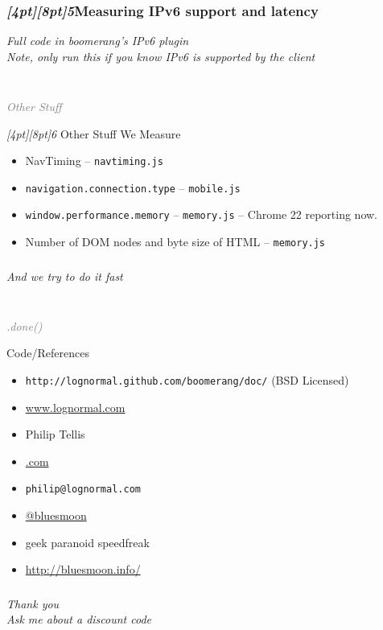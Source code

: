 \documentclass{beamer}
\newcommand{\sn}[1]{\textrm{\textit{\Huge{\raisebox{-3pt}[4pt][8pt]{\textcolor{f2elblue}{#1}}}}}\hspace{4pt}}
\newcommand{\innersplash}[1]{
  \begin{center}
    \large \textrm{\textit{ #1 } }
  \end{center}
}
\newcommand{\splashslide}[2][{}]{
  \begin{frame}
  \frametitle{#1}
  \innersplash{#2}
  \end{frame}
}
\newcommand{\leadinslide}[2]{
  \splashslide{
     {\fontsize{150}{20}\selectfont{\raisebox{0pt}[90pt][0pt]{\textcolor{light-gray}{#1}}}} \\ \huge \textcolor{gray}{#2}
  }
}
\begin{document}
\splashslide[\sn{5}Measuring IPv6 support and latency]{ Full code in boomerang's IPv6 plugin \\ \tiny Note, only run this if you know IPv6 is supported by the client}

\leadinslide{6}{Other Stuff}

\begin{frame}{\sn{6} Other Stuff We Measure}
\begin{itemize}
  \item NavTiming -- \texttt{navtiming.js}
  \item \texttt{navigation.connection.type} -- \texttt{mobile.js}
  \item \texttt{window.performance.memory}  -- \texttt{memory.js} -- Chrome 22 reporting now.
  \item Number of DOM nodes and byte size of HTML -- \texttt{memory.js}
\end{itemize}
\end{frame}

\splashslide{And we try to do it fast}

\leadinslide{--}{.done()}

\begin{frame}{Code/References}
  \begin{itemize}
    \item \texttt{http://lognormal.github.com/boomerang/doc/} (BSD Licensed)
    \item \href{http://www.lognormal.com}{www.lognormal.com}
  \end{itemize}
\end{frame}

\begin{frame}
  \begin{itemize}
  \item Philip Tellis
  \item \href{http://www.lognormal.com/}{\textrm{\textcolor{med-gray}{.com}}}
  \item \small{\texttt{philip@lognormal.com}}
  \item \href{http://twitter.com/bluesmoon}{@bluesmoon}
  \item geek paranoid speedfreak
  \item \href{http://bluesmoon.info/}{http://bluesmoon.info/}
  \end{itemize}
\end{frame}

\splashslide{\Huge Thank you \\ \small Ask me about a discount code }
\end{document}
